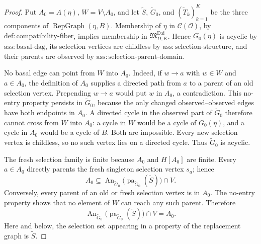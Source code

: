\documentclass{article}
\begin{document}
\begin{proof}
Put \(A_0=A(\eta)\), \(W=V\setminus A_0\), and let \(\widetilde S\), \(\widetilde G_0\), and \((\widetilde T_k)_{k=1}^K\) be the three components of \(\operatorname{RepGraph}(\eta,B)\).  Membership of \(\eta\) in \(\mathcal C(\mathcal O)\), by \(\mathrm{def:compatibility\mbox{-}fiber}\), implies membership in \(\mathfrak M_{D,K}^{\mathrm{Dai}}\).  Hence \(G_0(\eta)\) is acyclic by \(\mathrm{ass:basal\mbox{-}dag}\), its selection vertices are childless by \(\mathrm{ass:selection\mbox{-}structure}\), and their parents are observed by \(\mathrm{ass:selection\mbox{-}parent\mbox{-}domain}\).

No basal edge can point from \(W\) into \(A_0\).  Indeed, if \(w\to a\) with \(w\in W\) and \(a\in A_0\), the definition of \(A_0\) supplies a directed path from \(a\) to a parent of an old selection vertex.  Prepending \(w\to a\) would put \(w\) in \(A_0\), a contradiction.  This no-entry property persists in \(\widetilde G_0\), because the only changed observed--observed edges have both endpoints in \(A_0\).  A directed cycle in the observed part of \(\widetilde G_0\) therefore cannot cross from \(W\) into \(A_0\): a cycle in \(W\) would be a cycle of \(G_0(\eta)\), and a cycle in \(A_0\) would be a cycle of \(B\).  Both are impossible.  Every new selection vertex is childless, so no such vertex lies on a directed cycle.  Thus \(\widetilde G_0\) is acyclic.

The fresh selection family is finite because \(A_0\) and \(H[A_0]\) are finite.  Every \(a\in A_0\) directly parents the fresh singleton selection vertex \(s_a\); hence
\[
 A_0\subseteq
 \operatorname{An}_{\widetilde G_0}
 \bigl(\operatorname{pa}_{\widetilde G_0}(\widetilde S)\bigr)\cap V.
\]
Conversely, every parent of an old or fresh selection vertex is in \(A_0\).  The no-entry property shows that no element of \(W\) can reach any such parent.  Therefore
\[
 \operatorname{An}_{\widetilde G_0}
 \bigl(\operatorname{pa}_{\widetilde G_0}(\widetilde S)\bigr)\cap V
 =A_0.
 \tag{1}
\]
Here and below, the selection set appearing in a property of the replacement graph is \(\widetilde S\).


\end{proof}
\end{document}
